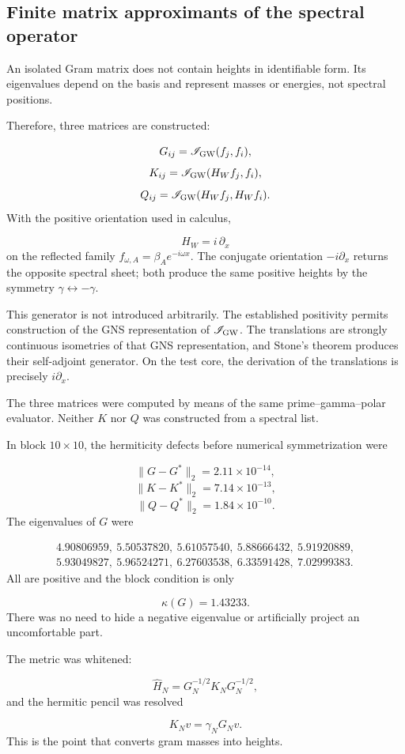 \subsection{Finite matrix approximants of the spectral operator}
An isolated Gram matrix does not contain heights in identifiable form. Its eigenvalues depend on the basis and represent masses or energies, not spectral positions.\par
Therefore, three matrices are constructed:\par
\[
G_{ij}=\mathscr I_{\rm GW}(f_j,f_i),
\]
\[
K_{ij}=\mathscr I_{\rm GW}(H_Wf_j,f_i),
\]
\[
Q_{ij}=\mathscr I_{\rm GW}(H_Wf_j,H_Wf_i).
\]
With the positive orientation used in calculus,\par
\[
H_W=i\,\partial_x
\]
on the reflected family \(f_{\omega,A}=\beta_Ae^{-i\omega x}\). The conjugate orientation \(-i\partial_x\) returns the opposite spectral sheet; both produce the same positive heights by the symmetry \(\gamma\leftrightarrow-\gamma\).\par
This generator is not introduced arbitrarily. The established positivity permits construction of the GNS representation of \(\mathscr I_{\rm GW}\). The translations are strongly continuous isometries of that GNS representation, and Stone's theorem produces their self-adjoint generator. On the test core, the derivation of the translations is precisely \(i\partial_x\).\par
The three matrices were computed by means of the same prime–gamma–polar evaluator. Neither \(K\) nor \(Q\) was constructed from a spectral list.\par
In block \(10\times10\), the hermiticity defects before numerical symmetrization were\par
\[
\|G-G^*\|_2=2.11\times10^{-14},
\]
\[
\|K-K^*\|_2=7.14\times10^{-13},
\]
\[
\|Q-Q^*\|_2=1.84\times10^{-10}.
\]
The eigenvalues of \(G\) were\par
\[
\begin{aligned}
4.90806959,\ 5.50537820,\ 5.61057540,\ 5.88666432,\ 5.91920889,\\
5.93049827,\ 5.96524271,\ 6.27603538,\ 6.33591428,\ 7.02999383.
\end{aligned}
\]
All are positive and the block condition is only\par
\[
\kappa(G)=1.43233.
\]
There was no need to hide a negative eigenvalue or artificially project an uncomfortable part.\par
The metric was whitened:\par
\[
\widehat H_N
=
G_N^{-1/2}K_NG_N^{-1/2},
\]
and the hermitic pencil was resolved\par
\[
K_Nv=\gamma_NG_Nv.
\]
This is the point that converts gram masses into heights.\par
{}

